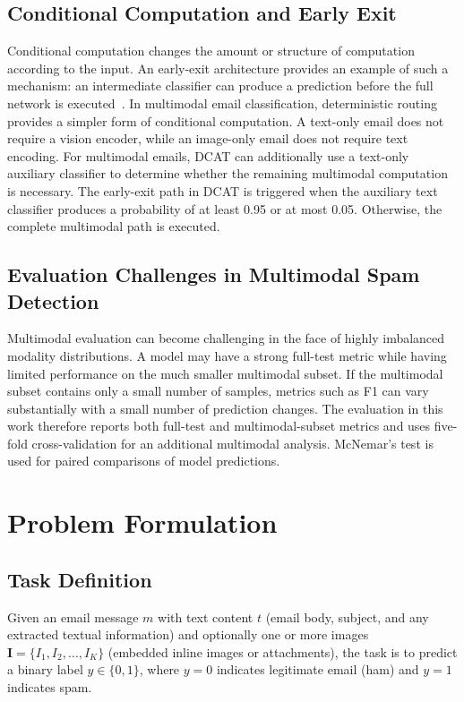 \documentclass[conference]{IEEEtran}
\begin{document}
\subsection{Conditional Computation and Early Exit}
Conditional computation changes the amount or structure of computation according to the input. An early-exit architecture provides an example of such a mechanism: an intermediate classifier can produce a prediction before the full network is executed~\cite{ref23}.
In multimodal email classification, deterministic routing provides a simpler form of conditional computation. A text-only email does not require a vision encoder, while an image-only email does not require text encoding. For multimodal emails, DCAT can additionally use a text-only auxiliary classifier to determine whether the remaining multimodal computation is necessary.
The early-exit path in DCAT is triggered when the auxiliary text classifier produces a probability of at least 0.95 or at most 0.05. Otherwise, the complete multimodal path is executed.
\subsection{Evaluation Challenges in Multimodal Spam Detection}
Multimodal evaluation can become challenging in the face of highly imbalanced modality distributions. A model may have a strong full-test metric while having limited performance on the much smaller multimodal subset. If the multimodal subset contains only a small number of samples, metrics such as F1 can vary substantially with a small number of prediction changes.
The evaluation in this work therefore reports both full-test and multimodal-subset metrics and uses five-fold cross-validation for an additional multimodal analysis. McNemar's test is used for paired comparisons of model predictions.

\section{Problem Formulation}
\subsection{Task Definition}
Given an email message $m$ with text content $t$ (email body, subject, and any extracted textual information) and optionally one or more images $\mathbf{I} = \{I_1, I_2, \ldots, I_K\}$ (embedded inline images or attachments), the task is to predict a binary label $y \in \{0,1\}$, where $y=0$ indicates legitimate email (ham) and $y=1$ indicates spam.
\end{document}
